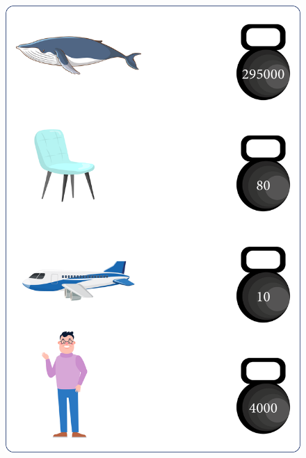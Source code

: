 \begin{figure}[htpb!]
\centering
\includegraphics[width=.85\textwidth]{./media/image41.png}
\end{figure}

\pagebreak





